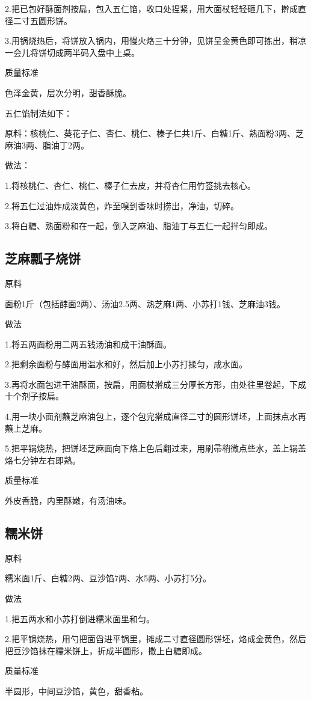 \documentclass{ctexbook}
\begin{document}
2.把已包好酥面剂按扁，包入五仁馅，收口处捏紧，用大面杖轻轻砸几下，擀成直径二寸五圆形饼。

3.用锅烧热后，将饼放入锅内，用慢火烙三十分钟，见饼呈金黄色即可拣出，稍凉一会儿将饼切成两半码入盘中上桌。

质量标准

色泽金黄，层次分明，甜香酥脆。

五仁馅制法如下：

原料：核桃仁、葵花子仁、杏仁、桃仁、榛子仁共1斤、白糖1斤、熟面粉3两、芝麻油3两、脂油丁2两。

做法：

1.将核桃仁、杏仁、桃仁、榛子仁去皮，并将杏仁用竹签挑去核心。

2.将五仁过油炸成淡黄色，炸至嗅到香味时捞出，净油，切碎。

3.将白糖、熟面粉和在一起，倒入芝麻油、脂油丁与五仁一起拌匀即成。
\subsection{芝麻瓢子烧饼}
原料

面粉1斤（包括酵面2两）、汤油2.5两、熟芝麻1两、小苏打1钱、芝麻油3钱。

做法

1.将五两面粉用二两五钱汤油和成干油酥面。

2.把剩余面粉与酵面用温水和好，然后加上小苏打揉匀，成水面。

3.再将水面包进干油酥面，按扁，用面杖擀成三分厚长方形，由处往里卷起，下成十个剂子按扁。

4.用一块小面剂蘸芝麻油包上，逐个包完擀成直径二寸的圆形饼坯，上面抹点水再蘸上芝麻。

5.把平锅烧热，把饼坯芝麻面向下烙上色后翻过来，用刷帚稍微点些水，盖上锅盖烙七分钟左右即熟。

质量标准

外皮香脆，内里酥嫩，有汤油味。
\subsection{糯米饼}
原料

糯米面1斤、白糖2两、豆沙馅7两、水5两、小苏打5分。

做法

1.把五两水和小苏打倒进糯米面里和匀。

2.把平锅烧热，用勺把面舀进平锅里，摊成二寸直径圆形饼坯，烙成金黄色，然后把豆沙馅抹在糯米饼上，折成半圆形，撒上白糖即成。

质量标准

半圆形，中间豆沙馅，黄色，甜香粘。
\end{document}
